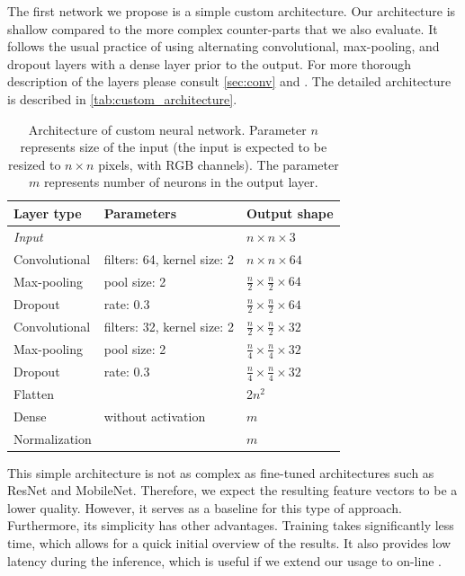 The first network we propose is a simple custom architecture. Our architecture is shallow compared to the more complex counter-parts that we also evaluate. It follows the usual practice of using alternating convolutional, max-pooling, and dropout layers with a dense layer prior to the output. For more thorough description of the layers please consult \autoref{sec:conv} and \cite{deeplearningbook}. The detailed architecture is described in \autoref{tab:custom_architecture}.

\begin{table}
    \centering
    \begin{tabular}{l|l|l}
         Layer type & Parameters & Output shape \\ \hline
         \emph{Input} & & $n \times n \times 3$ \\
         Convolutional & filters: 64, kernel size: 2 & $n \times n \times 64$ \\
         Max-pooling & pool size: 2 & $\frac{n}{2} \times \frac{n}{2} \times 64$ \\
         Dropout & rate: 0.3 & $\frac{n}{2} \times \frac{n}{2} \times 64$ \\
         Convolutional & filters: 32, kernel size: 2 & $\frac{n}{2} \times \frac{n}{2} \times 32$ \\
         Max-pooling & pool size: 2 & $\frac{n}{4} \times \frac{n}{4} \times 32$ \\
         Dropout & rate: 0.3 & $\frac{n}{4} \times \frac{n}{4} \times 32$ \\
         Flatten & & 2$n^2$ \\
         Dense & without activation & $m$ \\
         Normalization & & $m$
    \end{tabular}
    \caption[Architecture of custom neural network]{Architecture of custom neural network. Parameter $n$ represents size of the input (the input is expected to be resized to $n\times n$ pixels, with RGB channels). The parameter $m$ represents number of neurons in the output layer.}
    \label{tab:custom_architecture}
\end{table}

This simple architecture is not as complex as fine-tuned architectures such as ResNet and MobileNet. Therefore, we expect the resulting feature vectors to be a lower quality. However, it serves as a baseline for this type of approach. Furthermore, its simplicity has other advantages. Training takes significantly less time, which allows for a quick initial overview of the results. It also provides low latency during the inference, which is useful if we extend our usage to on-line \reid{}.

